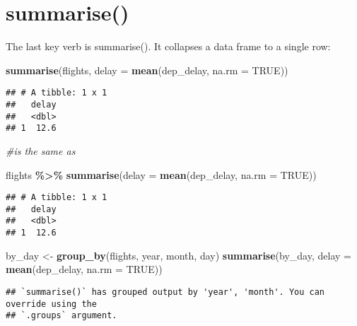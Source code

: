 \documentclass[
]{article}
\newenvironment{Shaded}{\begin{snugshade}}{\end{snugshade}}
\newcommand{\AttributeTok}[1]{\textcolor[rgb]{0.13,0.29,0.53}{#1}}
\newcommand{\CommentTok}[1]{\textcolor[rgb]{0.56,0.35,0.01}{\textit{#1}}}
\newcommand{\ConstantTok}[1]{\textcolor[rgb]{0.56,0.35,0.01}{#1}}
\newcommand{\FunctionTok}[1]{\textcolor[rgb]{0.13,0.29,0.53}{\textbf{#1}}}
\newcommand{\NormalTok}[1]{#1}
\newcommand{\OtherTok}[1]{\textcolor[rgb]{0.56,0.35,0.01}{#1}}
\newcommand{\SpecialCharTok}[1]{\textcolor[rgb]{0.81,0.36,0.00}{\textbf{#1}}}
\begin{document}
\hypertarget{summarise}{%
\section{summarise()}\label{summarise}}

The last key verb is summarise(). It collapses a data frame to a single
row:

\begin{Shaded}
\begin{Highlighting}[]
\FunctionTok{summarise}\NormalTok{(flights, }\AttributeTok{delay =} \FunctionTok{mean}\NormalTok{(dep\_delay, }\AttributeTok{na.rm =} \ConstantTok{TRUE}\NormalTok{))}
\end{Highlighting}
\end{Shaded}

\begin{verbatim}
## # A tibble: 1 x 1
##   delay
##   <dbl>
## 1  12.6
\end{verbatim}

\begin{Shaded}
\begin{Highlighting}[]
\CommentTok{\#is the same as }

\NormalTok{flights }\SpecialCharTok{\%\textgreater{}\%} \FunctionTok{summarise}\NormalTok{(}\AttributeTok{delay =} \FunctionTok{mean}\NormalTok{(dep\_delay, }\AttributeTok{na.rm =} \ConstantTok{TRUE}\NormalTok{))}
\end{Highlighting}
\end{Shaded}

\begin{verbatim}
## # A tibble: 1 x 1
##   delay
##   <dbl>
## 1  12.6
\end{verbatim}

\begin{Shaded}
\begin{Highlighting}[]
\NormalTok{by\_day }\OtherTok{\textless{}{-}} \FunctionTok{group\_by}\NormalTok{(flights, year, month, day)}
\FunctionTok{summarise}\NormalTok{(by\_day, }\AttributeTok{delay =} \FunctionTok{mean}\NormalTok{(dep\_delay, }\AttributeTok{na.rm =} \ConstantTok{TRUE}\NormalTok{))}
\end{Highlighting}
\end{Shaded}

\begin{verbatim}
## `summarise()` has grouped output by 'year', 'month'. You can override using the
## `.groups` argument.
\end{verbatim}
\end{document}
